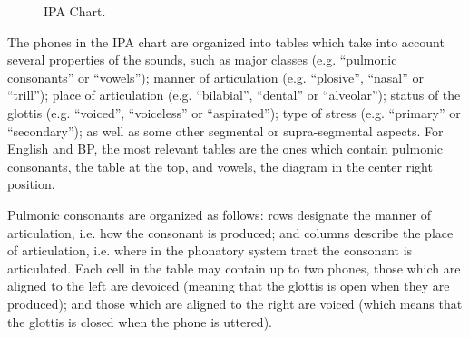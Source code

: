 \begin{figure}[!ht]
        \noindent{}
        \caption{IPA Chart.}\label{fig:ipa-chart}
\end{figure}


The phones in the \ac{IPA} chart are organized into tables which take into account several properties of the sounds, such as major classes (e.g. ``pulmonic consonants'' or ``vowels''); manner of articulation (e.g. ``plosive'', ``nasal'' or ``trill''); place of articulation (e.g. ``bilabial'', ``dental'' or ``alveolar''); status of the glottis (e.g. ``voiced'', ``voiceless'' or ``aspirated''); type of stress (e.g. ``primary'' or ``secondary''); as well as some other segmental or supra-segmental aspects. For English and \gls{BP}, the most relevant tables are the ones which contain pulmonic consonants, the table at the top, and vowels, the diagram in the center right position. 

Pulmonic consonants are organized as follows: rows designate the manner of articulation, i.e. how the consonant is produced; and columns describe the place of articulation, i.e. where in the phonatory system tract the consonant is articulated. Each cell in the table may contain up to two phones, those which are aligned to the left are devoiced (meaning that the glottis is open when they are produced); and those which are aligned to the right are voiced (which means that the glottis is closed when the phone is uttered). 

